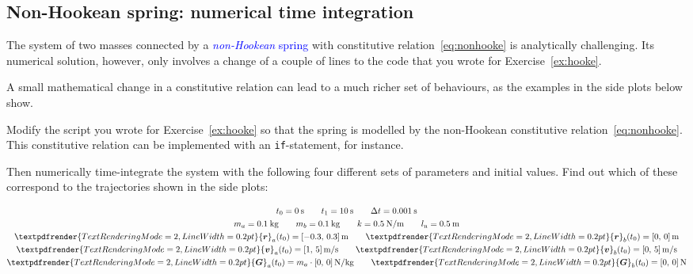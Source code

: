 \documentclass[a4paper,12pt,%
onecolumn,oneside,%
british%
]{memoir}
\renewcommand*{\bm}[1]{\textpdfrender{TextRenderingMode=2,LineWidth=0.2pt}{\boldsymbol{#1}}}
\newcommand*{\incr}{\Delta}%
\renewcommand*{\|}[1][]{\nonscript\:#1\vert\nonscript\:\mathopen{}}
\newcommand*{\sect}{\S}%
\renewcommand*{\autoref}[2]{\sidepar{\vspace{-1ex}\footnotesize{\color{blue}\faIcon{%
angle-right%
}\enskip\sect~\ref{#1} page~\pageref{#1}}}\textcolor{blue}{#2}}
\newcommand*{\yr}{\bm{r}}
\newcommand*{\yra}{\yr_{a}}
\newcommand*{\yrb}{\yr_{b}}
\newcommand*{\yv}{\bm{v}}
\newcommand*{\yva}{\yv_{a}}
\newcommand*{\yvb}{\yv_{b}}
\newcommand*{\ylo}{l_{\textrm{n}}}
\newcommand*{\yti}{t_{0}}
\newcommand*{\ytf}{t_{1}}
\newcommand*{\Dt}{\incr t}
\newcommand*{\ym}{m}%
\newcommand*{\yma}{\ym_{a}}
\newcommand*{\ymb}{\ym_{b}}
\newcommand*{\yG}{\bm{G}}
\newcommand*{\yGa}{\yG_{a}}
\newcommand*{\yGb}{\yG_{b}}
\begin{document}
\subsection{Non-Hookean spring: numerical time integration}
\label{sec:nonHooke_simulation}

The system of two masses connected by a \autoref{sec:nonhooke}{\emph{non-Hookean} spring} with constitutive relation~\eqref{eq:nonhooke} is analytically challenging.
Its numerical solution, however, only involves a change of a couple of lines to the code that you wrote for Exercise~\ref{ex:hooke}.

A small mathematical change in a constitutive relation can lead to a much richer set of behaviours, as the examples in the side plots below show.

\begin{exercise}[label={ex:nonhooke}]
  Modify the script you wrote for Exercise~\ref{ex:hooke} so that the spring is modelled by the non-Hookean constitutive relation~\eqref{eq:nonhooke}. This constitutive relation can be implemented with an \texttt{if}-statement, for instance.

  Then numerically time-integrate the system with the following four different sets of parameters and initial values. Find out which of these correspond to the trajectories shown in the side plots:
\begin{description}[itemsep=\baselineskip]
      \item[Set 1:]
        \begin{equation*}
      \begin{gathered}
        \yti=\qty{0}{s}
        \qquad
        \ytf=\qty{10}{s}
        \qquad
        \Dt = \qty{0.001}{s}
        \\
        \yma=\qty{0.1}{kg}
        \qquad
        \ymb=\qty{0.1}{kg}
        \qquad
        k=\qty{0.5}{N/m}
        \qquad
        \ylo = \qty{0.5}{m}
        \\
        \yra(\yti)=[\num{-0.3},\, \num{0.3}]\,\unit{m}
        \qquad
        \yrb(\yti)=[\num{0},\, \num{0}]\,\unit{m}
        \\
        \yva(\yti)=[\num{1},\, \num{5}]\,\unit{m/s}
        \qquad
        \yvb(\yti)=[\num{0},\, \num{5}]\,\unit{m/s}
        \\
        \yGa(\yti)= \yma\cdot[\num{0},\, \num{0}]\,\unit{N/kg}
        \qquad
        \yGb(\yti)=[\num{0},\, \num{0}]\,\unit{N}
      \end{gathered}
    \end{equation*}


\end{description}
\end{exercise}
\end{document}
